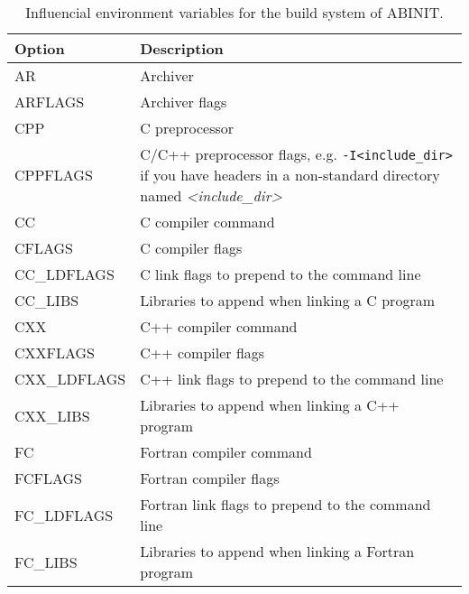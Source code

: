 %
\begin{table}
\begin{centering}
\begin{tabular}{|l|p{12cm}|}
\hline 
\textbf{Option}  & \textbf{Description} \tabularnewline
\hline 
AR  & Archiver \tabularnewline
ARFLAGS  & Archiver flags \tabularnewline
\hline 
CPP  & C preprocessor \tabularnewline
CPPFLAGS  & C/C++ preprocessor flags, e.g. \texttt{-I<include\_dir>} if you have
headers in a non-standard directory named \textit{<include\_dir>} \tabularnewline
\hline 
CC  & C compiler command \tabularnewline
CFLAGS  & C compiler flags \tabularnewline
CC\_LDFLAGS  & C link flags to prepend to the command line \tabularnewline
CC\_LIBS  & Libraries to append when linking a C program \tabularnewline
\hline 
CXX  & C++ compiler command \tabularnewline
CXXFLAGS  & C++ compiler flags \tabularnewline
CXX\_LDFLAGS  & C++ link flags to prepend to the command line \tabularnewline
CXX\_LIBS  & Libraries to append when linking a C++ program \tabularnewline
\hline 
FC  & Fortran compiler command \tabularnewline
FCFLAGS  & Fortran compiler flags \tabularnewline
FC\_LDFLAGS  & Fortran link flags to prepend to the command line \tabularnewline
FC\_LIBS  & Libraries to append when linking a Fortran program \tabularnewline
\hline
\end{tabular}
\par\end{centering}

\caption{Influencial environment variables for the build system of ABINIT.}


\label{tab:env-summary} 
\end{table}


